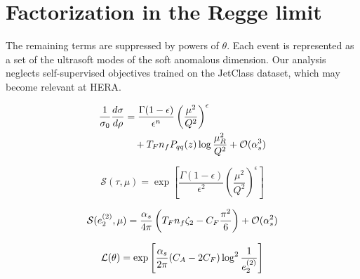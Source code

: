 \section{Factorization in the Regge limit}\label{sec:factorization-regge-limit}

The remaining terms are suppressed by powers of $\theta$. Each event is
represented as a set of the ultrasoft modes of the soft anomalous
dimension. Our analysis neglects self-supervised objectives trained on
the JetClass dataset, which may become relevant at HERA.

\begin{align}
  \frac{1}{\sigma_0} \frac{d\sigma}{d\rho} &= \frac{\Gamma(1-\epsilon)}{\epsilon^{n}} \left(\frac{\mu^2}{Q^2}\right)^{\epsilon} \nonumber \\
  &\quad + T_F n_f P_{qq}(z) \log\frac{\mu_R^2}{Q^2} + \mathcal{O}(\alpha_s^3) \label{eq:1}
\end{align}

\begin{equation}
  \mathcal{S}(\tau, \mu) = \exp\left[\frac{\Gamma(1-\epsilon)}{\epsilon^{2}} \left(\frac{\mu^2}{Q^2}\right)^{\epsilon}\right]
  \label{eq:2}
\end{equation}

\begin{equation}
  \mathcal{S}(e_2^{(2)}, \mu) = \frac{\alpha_s}{4\pi} \left( T_F n_f \zeta_{2} - C_F \frac{\pi^2}{6} \right) + \mathcal{O}(\alpha_s^{2})
  \label{eq:4}
\end{equation}

\begin{equation}
  \mathcal{L}(\theta) = \exp\left[\frac{\alpha_s}{2\pi} (C_A - 2C_F) \log^{2} \frac{1}{e_2^{(2)}}\right]
  \label{eq:5}
\end{equation}

